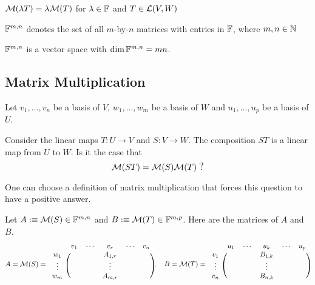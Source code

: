 \setcounter{thm}{37}
\begin{thm}
  $\mathcal{M}(\lambda T) = \lambda \mathcal{M}(T)$ for $\lambda \in \mathbb{F}$ and $T \in \mathcal{L} (V,W)$
\end{thm}

\begin{mydef} 
  $\mathbb{F}^{m,n}$ denotes the set of all $m$-by-$n$ matrices with entries in $\mathbb{F}$, where $m,n \in \mathbb{N}$
\end{mydef}

\begin{thm} %
  \label{thm: the dimension of the vector space of all m by n matrices is mn}
  $\mathbb{F}^{m,n}$ is a vector space with $\dim \mathbb{F}^{m,n}=mn$.
\end{thm}


\subsection{Matrix Multiplication}

Let $v_1, \ldots, v_n$ be a basis of $V$, $w_1, \ldots, w_m$ be a basis of $W$ and $u_1, \ldots, u_p$ be a basis of $U$.

Consider the linear maps $T: U \to V$ and $S: V \to W$. The composition $ST$ is a linear map from $U$ to $W$. Is it the case that
\begin{equation}
  \mmatrix(ST) = \mmatrix(S) \mmatrix(T) \; {\mathlarger ?}
\end{equation}

One can choose a definition of matrix multiplication that forces this question to have a positive answer.

Let $A :\equiv \mathcal{M}(S)\in \mathbb{F}^{m,n}$ and $B :\equiv \mathcal{M}(T)\in \mathbb{F}^{m,p}$. Here are the matrices of $A$ and $B$.
\begin{equation}
  A=\mathcal{M} (S) =
  \begin{blockarray}{cccccc}
    & v_1 & \cdots & v_r     & \cdots & v_n \\
    \begin{block}{c(ccccc)}
      w_1    &     &        & A_{1,r} &        &     \\
      \vdots &     &        & \vdots  &        &     \\
      w_m    &     &        & A_{m,r} &        &     \\
    \end{block}
  \end{blockarray},
  \quad
  B=\mathcal{M} (T) =
  \begin{blockarray}{cccccc}
    & u_1 & \cdots & u_k     & \cdots & u_p \\
    \begin{block}{c(ccccc)}
      v_1    &     &        & B_{1,k} &        &     \\
      \vdots &     &        & \vdots  &        &     \\
      v_n    &     &        & B_{n,k} &        &     \\
    \end{block}
  \end{blockarray}
\end{equation}

